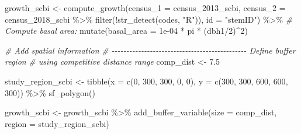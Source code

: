\documentclass[12pt]{article}
\newenvironment{Shaded}{\begin{snugshade}}{\end{snugshade}}
\newcommand{\AttributeTok}[1]{\textcolor[rgb]{0.77,0.63,0.00}{#1}}
\newcommand{\CommentTok}[1]{\textcolor[rgb]{0.56,0.35,0.01}{\textit{#1}}}
\newcommand{\DecValTok}[1]{\textcolor[rgb]{0.00,0.00,0.81}{#1}}
\newcommand{\FloatTok}[1]{\textcolor[rgb]{0.00,0.00,0.81}{#1}}
\newcommand{\FunctionTok}[1]{\textcolor[rgb]{0.00,0.00,0.00}{#1}}
\newcommand{\NormalTok}[1]{#1}
\newcommand{\OtherTok}[1]{\textcolor[rgb]{0.56,0.35,0.01}{#1}}
\newcommand{\SpecialCharTok}[1]{\textcolor[rgb]{0.00,0.00,0.00}{#1}}
\newcommand{\StringTok}[1]{\textcolor[rgb]{0.31,0.60,0.02}{#1}}
\begin{document}
\begin{Shaded}
\begin{Highlighting}[]
\NormalTok{growth\_scbi }\OtherTok{\textless{}{-}} \FunctionTok{compute\_growth}\NormalTok{(}\AttributeTok{census\_1 =}\NormalTok{ census\_2013\_scbi, }\AttributeTok{census\_2 =}\NormalTok{ census\_2018\_scbi }\SpecialCharTok{\%\textgreater{}\%}
    \FunctionTok{filter}\NormalTok{(}\SpecialCharTok{!}\FunctionTok{str\_detect}\NormalTok{(codes, }\StringTok{"R"}\NormalTok{)), }\AttributeTok{id =} \StringTok{"stemID"}\NormalTok{) }\SpecialCharTok{\%\textgreater{}\%}
    \CommentTok{\# Compute basal area:}
\FunctionTok{mutate}\NormalTok{(}\AttributeTok{basal\_area =} \FloatTok{1e{-}04} \SpecialCharTok{*}\NormalTok{ pi }\SpecialCharTok{*}\NormalTok{ (dbh1}\SpecialCharTok{/}\DecValTok{2}\NormalTok{)}\SpecialCharTok{\^{}}\DecValTok{2}\NormalTok{)}


\CommentTok{\# Add spatial information}
\CommentTok{\# {-}{-}{-}{-}{-}{-}{-}{-}{-}{-}{-}{-}{-}{-}{-}{-}{-}{-}{-}{-}{-}{-}{-}{-}{-}{-}{-}{-}{-}{-}{-}{-}{-}{-}{-}{-}{-}{-}{-}{-}{-}{-}{-}{-}{-}{-} Define buffer region}
\CommentTok{\# using competitive distance range}
\NormalTok{comp\_dist }\OtherTok{\textless{}{-}} \FloatTok{7.5}

\NormalTok{study\_region\_scbi }\OtherTok{\textless{}{-}} \FunctionTok{tibble}\NormalTok{(}\AttributeTok{x =} \FunctionTok{c}\NormalTok{(}\DecValTok{0}\NormalTok{, }\DecValTok{300}\NormalTok{, }\DecValTok{300}\NormalTok{, }\DecValTok{0}\NormalTok{, }\DecValTok{0}\NormalTok{), }\AttributeTok{y =} \FunctionTok{c}\NormalTok{(}\DecValTok{300}\NormalTok{, }\DecValTok{300}\NormalTok{, }\DecValTok{600}\NormalTok{,}
    \DecValTok{600}\NormalTok{, }\DecValTok{300}\NormalTok{)) }\SpecialCharTok{\%\textgreater{}\%}
    \FunctionTok{sf\_polygon}\NormalTok{()}

\NormalTok{growth\_scbi }\OtherTok{\textless{}{-}}\NormalTok{ growth\_scbi }\SpecialCharTok{\%\textgreater{}\%}
    \FunctionTok{add\_buffer\_variable}\NormalTok{(}\AttributeTok{size =}\NormalTok{ comp\_dist, }\AttributeTok{region =}\NormalTok{ study\_region\_scbi)}


\end{Highlighting}
\end{Shaded}
\end{document}
